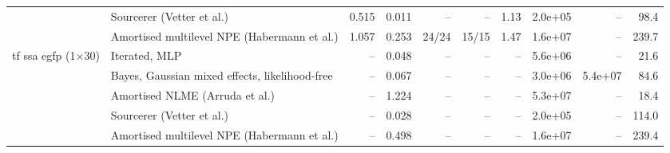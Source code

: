 \begin{tabular}{llrrrrrrrr}
 & Sourcerer (Vetter et al.) & 0.515 & 0.011 & -- & -- & 1.13 & 2.0e+05 & -- & 98.4 \\
 & Amortised multilevel NPE (Habermann et al.) & 1.057 & 0.253 & 24/24 & 15/15 & 1.47 & 1.6e+07 & -- & 239.7 \\ \addlinespace
tf ssa egfp (1$\times$30) & Iterated, MLP & -- & 0.048 & -- & -- & -- & 5.6e+06 & -- & 21.6 \\
 & Bayes, Gaussian mixed effects, likelihood-free & -- & 0.067 & -- & -- & -- & 3.0e+06 & 5.4e+07 & 84.6 \\
 & Amortised NLME (Arruda et al.) & -- & 1.224 & -- & -- & -- & 5.3e+07 & -- & 18.4 \\
 & Sourcerer (Vetter et al.) & -- & 0.028 & -- & -- & -- & 2.0e+05 & -- & 114.0 \\
 & Amortised multilevel NPE (Habermann et al.) & -- & 0.498 & -- & -- & -- & 1.6e+07 & -- & 239.4 \\
\bottomrule
\end{tabular}
